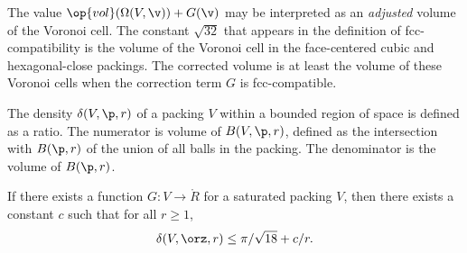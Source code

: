 \begin{remark}
The value $\op{vol}(\Omega(V,\v)) + G(\v)$ may be interpreted as an
{\it adjusted\/} volume of the Voronoi cell. The constant
$\sqrt{32}$ that appears in the definition of fcc-compatibility is
the volume of the Voronoi cell in the face-centered cubic and
hexagonal-close packings.  The corrected volume is at least the
volume of these Voronoi cells when the correction term $G$ is
fcc-compatible.  %
\end{remark}




The density $\delta( V,\p,r)$ of a packing $ V$ within a bounded
region of space is defined as a ratio. The numerator is volume of
$B(V,\p,r)$, defined as the intersection with $B(\p,r)$ of the union
of all balls in the packing.  The denominator is the volume of
$B(\p,r)$. 
%
%


\begin{lemma} 
\label{lemma:deltabound} %
If there exists a  
function $G: V\to\ring{R}$ for a saturated packing $ V$, then there
exists a constant $c$ such that for all $r\ge1$,
\begin{displaymath} 
\delta( V,\orz,r)
\le \pi/\sqrt{18} + c/r.
\end{displaymath}
\end{lemma}




